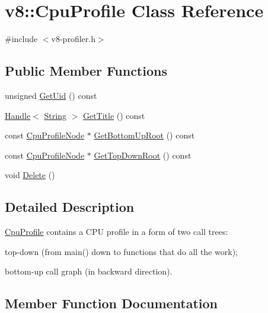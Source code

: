 \hypertarget{classv8_1_1_cpu_profile}{}\section{v8\+:\+:Cpu\+Profile Class Reference}
\label{classv8_1_1_cpu_profile}


{\ttfamily \#include $<$v8-\/profiler.\+h$>$}

\subsection*{Public Member Functions}
\begin{DoxyCompactItemize}
\item 
unsigned \hyperlink{classv8_1_1_cpu_profile_a382bbf10d24a2cd8b17acb8508c56a58}{Get\+Uid} () const 
\item 
\hyperlink{classv8_1_1_handle}{Handle}$<$ \hyperlink{classv8_1_1_string}{String} $>$ \hyperlink{classv8_1_1_cpu_profile_afbb44d5cf0a8729c9074aba03207e5cc}{Get\+Title} () const 
\item 
const \hyperlink{classv8_1_1_cpu_profile_node}{Cpu\+Profile\+Node} $\ast$ \hyperlink{classv8_1_1_cpu_profile_ac056d92eaf995873d827d4697a334c6a}{Get\+Bottom\+Up\+Root} () const 
\item 
const \hyperlink{classv8_1_1_cpu_profile_node}{Cpu\+Profile\+Node} $\ast$ \hyperlink{classv8_1_1_cpu_profile_aec978f073af6634b6495baa65209a31f}{Get\+Top\+Down\+Root} () const 
\item 
void \hyperlink{classv8_1_1_cpu_profile_a70c93f0c14d07a7e1bad42ee95665ca0}{Delete} ()
\end{DoxyCompactItemize}


\subsection{Detailed Description}
\hyperlink{classv8_1_1_cpu_profile}{Cpu\+Profile} contains a C\+P\+U profile in a form of two call trees\+:
\begin{DoxyItemize}
\item top-\/down (from main() down to functions that do all the work);
\item bottom-\/up call graph (in backward direction). 
\end{DoxyItemize}

\subsection{Member Function Documentation}
\hypertarget{classv8_1_1_cpu_profile_a70c93f0c14d07a7e1bad42ee95665ca0}{}

